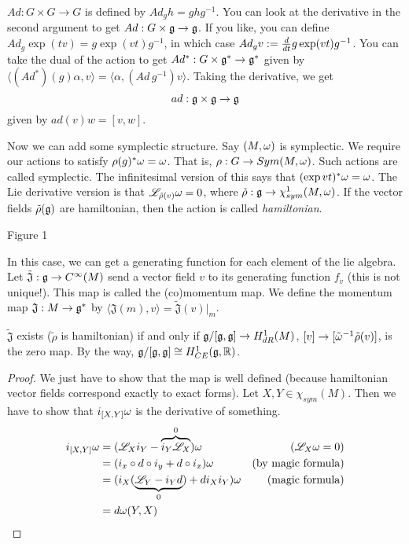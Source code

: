  $Ad:G\times G\to G$ is defined by $Ad_g h=ghg^{-1}$.  You can look
 at the derivative in the second argument to get $Ad:G\times \mathfrak{g}\to
 \mathfrak{g}$.  If you like, you can define $Ad_g\exp(tv)=g\exp(vt)g^{-1}$,
 in which case $Ad_g v:= \frac{d }{d t} g\exp(vt)g^{-1}$.  You can take
 the dual of the action to get $Ad^*:G\times \mathfrak{g}^*\to \mathfrak{g}^*$ given
 by $\langle (Ad^*)(g)\alpha,v\rangle = \langle \alpha,(Ad\,
 g^{-1})v\rangle$.  Taking the derivative, we get
 \[
    ad:\mathfrak{g}\times\mathfrak{g} \to \mathfrak{g}
 \]
 given by $ad(v)w=[v,w]$.

 Now we can add some symplectic structure.  Say $(M,\omega)$ is
 symplectic.  We require our actions to satisfy $\rho(g)^*\omega=\omega$.
 That is, $\rho:G\to Sym(M,\omega)$.  Such actions are called
 symplectic.  The infinitesimal version of this says that $(\exp
 vt)^*\omega=\omega$.  The Lie derivative version is that $\mathscr{L}_{\tilde
 \rho(v)} \omega=0$, where $\tilde\rho:\mathfrak{g}\to \chi^1_{sym}(M,\omega)$.  If
 the vector fields $\tilde\rho(\mathfrak{g})$ are hamiltonian, then the
 action is called \emph{hamiltonian}.

 Figure 1

 In this case, we can get a generating function for each element
 of the lie algebra.  Let $\tilde{\mathfrak{J}}:\mathfrak{g}\to C^\infty
 (M)$ send a vector field $v$ to its generating function $f_v$
 (this is not unique!). This map is called the (co)momentum map.
 We define the momentum map $\mathfrak{J}:M\to \mathfrak{g}^*$ by $\langle
 \mathfrak{J}(m),v\rangle = \tilde{\mathfrak{J}}(v)|_m$.

 \begin{proposition}
   $\tilde{\mathfrak{J}}$ exists ($\tilde \rho$ is hamiltonian) if
   and only if $\mathfrak{g}/[\mathfrak{g},\mathfrak{g}]\to H^1_{dR}(M)$, $[v]\to
   [\tilde{\omega}^{-1}\tilde\rho(v)]$, is the zero map.  By the way,
   $\mathfrak{g}/[\mathfrak{g},\mathfrak{g}]\cong H^1_{CE}(\mathfrak{g},\mathbb{R})$.
 \end{proposition}
 \begin{proof}
   We just have to show that the map is well defined (because
   hamiltonian vector fields correspond exactly to exact forms).
   Let $X,Y\in \chi_{sym}(M)$.  Then we have to show that
   $i_{[X,Y]}\omega$ is the derivative of something.
   \begin{align*}
     i_{[X,Y]}\omega &= (\mathscr{L}_Xi_Y-\overbrace{i_Y\mathscr{L}_X}^0)\omega &(\mathscr{L}_X\omega=0)\\
        &= (i_x\circ d\circ i_y + d\circ i_x)\omega &\text{(by magic
        formula)}\\
        &= (i_X(\underbrace{\mathscr{L}_Y-i_Yd}_0) + di_Xi_Y)\omega &\text{(magic formula)}\\
        &= d\omega(Y,X)
   \end{align*}
 \end{proof}

